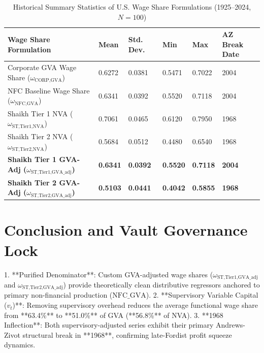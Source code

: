 \documentclass[11pt,a4paper]{article}
\begin{document}
\begin{table}[h!]
\centering
\small
\caption{Historical Summary Statistics of U.S. Wage Share Formulations (1925--2024, $N=100$)}
\label{tab:empirical_summary}
\begin{tabular}{p{5.5cm} p{1.6cm} p{1.6cm} p{1.6cm} p{1.6cm} p{2.2cm}}
\toprule
\textbf{Wage Share Formulation} & \textbf{Mean} & \textbf{Std. Dev.} & \textbf{Min} & \textbf{Max} & \textbf{AZ Break Date} \\
\midrule
Corporate GVA Wage Share ($\omega_{\text{CORP,GVA}}$) & 0.6272 & 0.0381 & 0.5471 & 0.7022 & 2004 \\
NFC Baseline Wage Share ($\omega_{\text{NFC,GVA}}$) & 0.6341 & 0.0392 & 0.5520 & 0.7118 & 2004 \\
Shaikh Tier 1 NVA ($\omega_{\text{ST,Tier1,NVA}}$) & 0.7061 & 0.0465 & 0.6120 & 0.7950 & 1968 \\
Shaikh Tier 2 NVA ($\omega_{\text{ST,Tier2,NVA}}$) & 0.5684 & 0.0512 & 0.4480 & 0.6540 & 1968 \\
\textbf{Shaikh Tier 1 GVA-Adj ($\omega_{\text{ST,Tier1,GVA\_adj}}$)} & \textbf{0.6341} & \textbf{0.0392} & \textbf{0.5520} & \textbf{0.7118} & \textbf{2004} \\
\textbf{Shaikh Tier 2 GVA-Adj ($\omega_{\text{ST,Tier2,GVA\_adj}}$)} & \textbf{0.5103} & \textbf{0.0441} & \textbf{0.4042} & \textbf{0.5855} & \textbf{1968} \\
\bottomrule
\end{tabular}
\end{table}

\FloatBarrier
\section{Conclusion and Vault Governance Lock}

1. **Purified Denominator**: Custom GVA-adjusted wage shares ($\omega_{\text{ST,Tier1,GVA\_adj}}$ and $\omega_{\text{ST,Tier2,GVA\_adj}}$) provide theoretically clean distributive regressors anchored to primary non-financial production ($\text{NFC\_GVA}$).
2. **Supervisory Variable Capital ($v_t$)**: Removing supervisory overhead reduces the average functional wage share from **63.4\%** to **51.0\%** of GVA (**56.8\%** of NVA).
3. **1968 Inflection**: Both supervisory-adjusted series exhibit their primary Andrews-Zivot structural break in **1968**, confirming late-Fordist profit squeeze dynamics.
\end{document}
